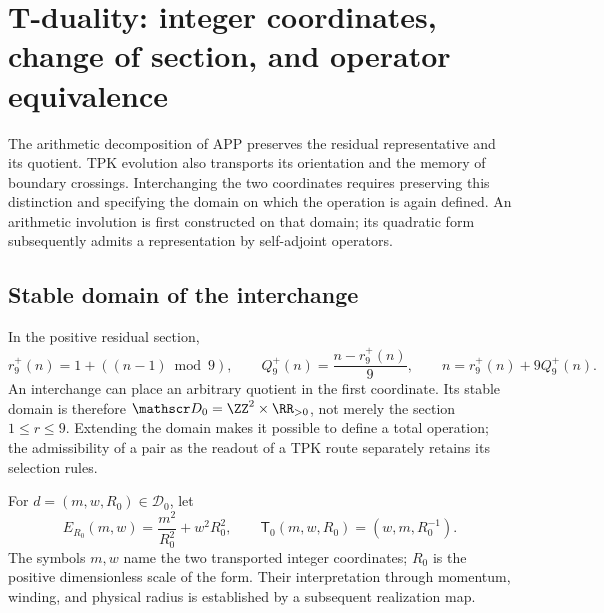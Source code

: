 \section{T-duality: integer coordinates, change of section, and operator equivalence}
\label{iv:iv:dualidad}

The arithmetic decomposition of APP preserves the residual representative
and its quotient. TPK evolution also transports its orientation and
the memory of boundary crossings. Interchanging the two
coordinates requires preserving this distinction and specifying the domain
on which the operation is again defined. An arithmetic involution is
first constructed on that domain; its quadratic form
subsequently admits a representation by self-adjoint operators.

\subsection{Stable domain of the interchange}

In the positive residual section,
\begin{equation}
 r_9^+(n)=1+((n-1)\bmod9),\qquad
 Q_9^+(n)=\frac{n-r_9^+(n)}9,
 \qquad n=r_9^+(n)+9Q_9^+(n).
 \label{iv:iv:eq:division-positiva}
\end{equation}
An interchange can place an arbitrary quotient in the first
coordinate. Its stable domain is therefore
\(\mathscr D_0=\ZZ^2\times\RR_{>0}\), not merely the section
\(1\leq r\leq9\). Extending the domain makes it possible to define
a total operation; the admissibility of a pair as the readout of
a TPK route separately retains its selection rules.

\begin{definition}
\label{iv:iv:def:dualidad}
For \(d=(m,w,R_0)\in\mathscr D_0\), let
\begin{equation}
 E_{R_0}(m,w)=\frac{m^2}{R_0^2}+w^2R_0^2,
 \qquad
 \mathsf T_0(m,w,R_0)=(w,m,R_0^{-1}).
 \label{iv:iv:eq:energia-t}
\end{equation}
The symbols \(m,w\) name the two transported integer
coordinates; \(R_0\) is the positive dimensionless scale of
the form. Their interpretation through momentum, winding, and
physical radius is established by a subsequent realization map.
\end{definition}

